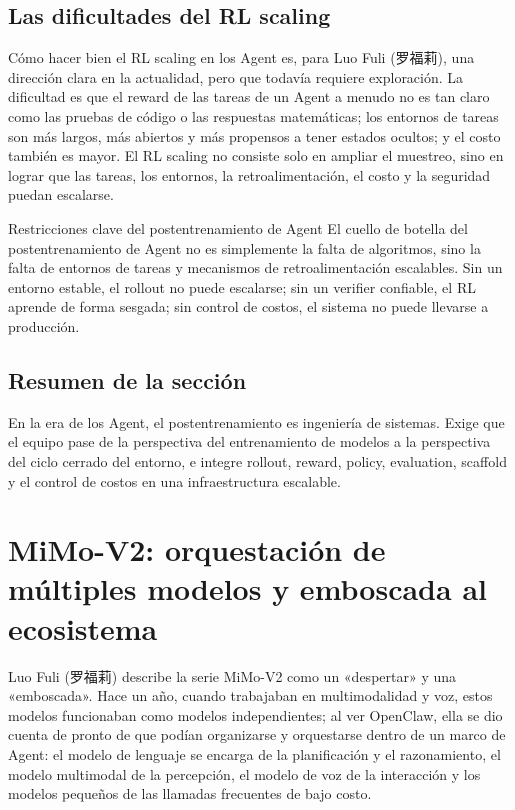 \documentclass[a4paper]{article}
\begin{document}
\subsection{Las dificultades del RL scaling}

Cómo hacer bien el RL scaling en los Agent es, para Luo Fuli (罗福莉), una dirección clara en la actualidad, pero que todavía requiere exploración. La dificultad es que el reward de las tareas de un Agent a menudo no es tan claro como las pruebas de código o las respuestas matemáticas; los entornos de tareas son más largos, más abiertos y más propensos a tener estados ocultos; y el costo también es mayor. El RL scaling no consiste solo en ampliar el muestreo, sino en lograr que las tareas, los entornos, la retroalimentación, el costo y la seguridad puedan escalarse.

\begin{importantbox}{Restricciones clave del postentrenamiento de Agent}
El cuello de botella del postentrenamiento de Agent no es simplemente la falta de algoritmos, sino la falta de entornos de tareas y mecanismos de retroalimentación escalables. Sin un entorno estable, el rollout no puede escalarse; sin un verifier confiable, el RL aprende de forma sesgada; sin control de costos, el sistema no puede llevarse a producción.
\end{importantbox}

\subsection{Resumen de la sección}

En la era de los Agent, el postentrenamiento es ingeniería de sistemas. Exige que el equipo pase de la perspectiva del entrenamiento de modelos a la perspectiva del ciclo cerrado del entorno, e integre rollout, reward, policy, evaluation, scaffold y el control de costos en una infraestructura escalable.
\section{MiMo-V2: orquestación de múltiples modelos y emboscada al ecosistema}

Luo Fuli (罗福莉) describe la serie MiMo-V2 como un «despertar» y una «emboscada». Hace un año, cuando trabajaban en multimodalidad y voz, estos modelos funcionaban como modelos independientes; al ver OpenClaw, ella se dio cuenta de pronto de que podían organizarse y orquestarse dentro de un marco de Agent: el modelo de lenguaje se encarga de la planificación y el razonamiento, el modelo multimodal de la percepción, el modelo de voz de la interacción y los modelos pequeños de las llamadas frecuentes de bajo costo.
\end{document}
